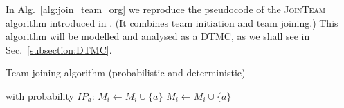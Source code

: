 \documentclass{llncs}
\newcommand{\comment}[1]{\marginpar{\footnotesize \color{red} \textsf{#1}}}
\begin{document}
In Alg.~\ref{alg:join_team_org} we reproduce the pseudocode of the \textsc{JoinTeam} algorithm introduced in \cite{gaston2005agent}. (It combines team initiation and team joining.) %
This algorithm will be modelled and analysed as a DTMC, as we shall see in Sec.~\ref{subsection:DTMC}.

\vspace{-6mm}

\begin{algorithm}[H]
\caption{Team joining algorithm \cite{gaston2005agent} (probabilistic and deterministic)}
\label{alg:join_team_org}
\begin{scriptsize}
\begin{algorithmic}
     
       
	 
	  \State with probability $IP_a$: $M_i \leftarrow M_i \cup \{a\}$ 
	\EndIf
       
	 
	  \State $M_i \leftarrow M_i \cup \{a\}$ 
	\EndIf
      \EndIf
    \EndIf
  \EndFor
\EndProcedure
\end{algorithmic}
\end{scriptsize}
\end{algorithm}
\vspace{-6mm}
%
\end{document}
